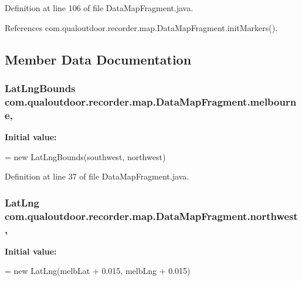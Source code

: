 Definition at line 106 of file Data\-Map\-Fragment.\-java.



References com.\-qualoutdoor.\-recorder.\-map.\-Data\-Map\-Fragment.\-init\-Markers().



\subsection{Member Data Documentation}
\hypertarget{classcom_1_1qualoutdoor_1_1recorder_1_1map_1_1DataMapFragment_aed652fd6268de6ddfe8bb36bb0a78762}{
\subsubsection[{melbourne}]{\setlength{\rightskip}{0pt plus 5cm}Lat\-Lng\-Bounds com.\-qualoutdoor.\-recorder.\-map.\-Data\-Map\-Fragment.\-melbourne\hspace{0.3cm}{\ttfamily [static]}, {\ttfamily [private]}}}\label{classcom_1_1qualoutdoor_1_1recorder_1_1map_1_1DataMapFragment_aed652fd6268de6ddfe8bb36bb0a78762}
{\bfseries Initial value\-:}
\begin{DoxyCode}
= \textcolor{keyword}{new} LatLngBounds(southwest,
            northwest)
\end{DoxyCode}


Definition at line 37 of file Data\-Map\-Fragment.\-java.

\hypertarget{classcom_1_1qualoutdoor_1_1recorder_1_1map_1_1DataMapFragment_a42c523ffb29115d4c52e3522412feb4a}{
\subsubsection[{northwest}]{\setlength{\rightskip}{0pt plus 5cm}Lat\-Lng com.\-qualoutdoor.\-recorder.\-map.\-Data\-Map\-Fragment.\-northwest\hspace{0.3cm}{\ttfamily [static]}, {\ttfamily [private]}}}\label{classcom_1_1qualoutdoor_1_1recorder_1_1map_1_1DataMapFragment_a42c523ffb29115d4c52e3522412feb4a}
{\bfseries Initial value\-:}
\begin{DoxyCode}
= \textcolor{keyword}{new} LatLng(melbLat + 0.015,
            melbLng + 0.015)
\end{DoxyCode}


